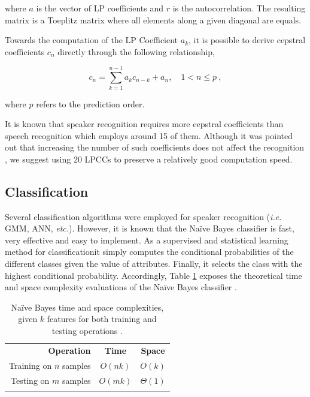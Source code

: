 \documentclass[cryptography,article,submit,moreauthors,pdftex,10pt,a4paper]{mdpi}
\begin{document}
\noindent where $a$ is the vector of LP coefficients and $r$ is the autocorrelation. The resulting matrix is a Toeplitz matrix where all elements along a given diagonal are equals.

Towards the computation of the LP Coefficient $a_k$, it is possible to derive cepstral coefficients $c_n$ directly through the following relationship,

\begin{equation}
\label{eq:12}
  	c_n = \sum\limits_{k=1}^{n-1}a_k c_{n-k} + a_n,\quad 1<n \leq p~,
\end{equation}

\noindent where $p$ refers to the prediction order.

It is known that speaker recognition requires more cepstral coefficients than speech recognition which employs around 15 of them. Although it was pointed out that increasing the number of such coefficients does not affect the recognition \cite{30}, we suggest using 20 LPCCs to preserve a relatively good computation speed.

\subsection{Classification}

Several classification algorithms were employed for speaker recognition (\textit{i.e.} GMM, ANN, \textit{etc.}). However, it is known that the Na\"ive Bayes classifier is fast, very effective and easy to implement. As a supervised and statistical learning method for classification\textemdash it simply computes the conditional probabilities of the different classes given the value of attributes. Finally, it selects the class with the highest conditional probability. Accordingly, Table \ref{tab:1} exposes the theoretical time and space complexity evaluations of the Na\"ive Bayes classifier \cite{31}.

\begin{table}[H]
\caption{Naïve Bayes time and space complexities, given $k$ features for both training and testing operations \cite{31}.}
\centering
\label{tab:1}
\begin{tabular}{rcc}
	\hline\noalign{\smallskip}
	\textbf{Operation} & \textbf{Time} & \textbf{Space}  \\
	\noalign{\smallskip}\hline\noalign{\smallskip}\hline\noalign{\smallskip}
		Training on $n$ samples & $O(nk)$ & $O(k)$ \\
		Testing on $m$ samples & $O(mk)$ & $\Theta(1)$ \\
	\noalign{\smallskip}\hline
\end{tabular}
\end{table}
\end{document}
